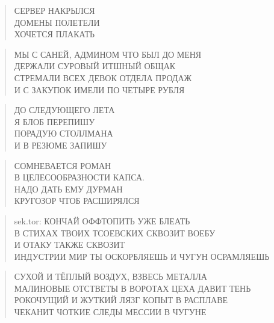 \poemtitle{***}
\begin{verse}
СЕРВЕР НАКРЫЛСЯ\\
ДОМЕНЫ ПОЛЕТЕЛИ\\
ХОЧЕТСЯ ПЛАКАТЬ
\end{verse}

\poemtitle{***}
\begin{verse}
МЫ С САНЕЙ, АДМИНОМ ЧТО БЫЛ ДО МЕНЯ\\
ДЕРЖАЛИ СУРОВЫЙ ИТШНЫЙ ОБЩАК\\
СТРЕМАЛИ ВСЕХ ДЕВОК ОТДЕЛА ПРОДАЖ\\
И С ЗАКУПОК ИМЕЛИ ПО ЧЕТЫРЕ РУБЛЯ
\end{verse}

\poemtitle{***}
\begin{verse}
ДО СЛЕДУЮЩЕГО ЛЕТА\\
Я БЛОБ ПЕРЕПИШУ\\
ПОРАДУЮ СТОЛЛМАНА\\
И В РЕЗЮМЕ ЗАПИШУ
\end{verse}

\poemtitle{***}
\begin{verse}
СОМНЕВАЕТСЯ РОМАН\\
В ЦЕЛЕСООБРАЗНОСТИ КАПСА.\\
НАДО ДАТЬ ЕМУ ДУРМАН\\
КРУГОЗОР ЧТОБ РАСШИРЯЛСЯ
\end{verse}

\poemtitle{***}
\begin{verse}
sek.tor: КОНЧАЙ ОФФТОПИТЬ УЖЕ БЛЕАТЬ\\
В СТИХАХ ТВОИХ ТСОЕВСКИХ СКВОЗИТ ВОЕБУ\\
И ОТАКУ ТАКЖЕ СКВОЗИТ\\
ИНДУСТРИИ МИР ТЫ ОСКОРБЛЯЕШЬ И ЧУГУН ОСРАМЛЯЕШЬ
\end{verse}

\poemtitle{***}
\begin{verse}
СУХОЙ И ТЁПЛЫЙ ВОЗДУХ, ВЗВЕСЬ МЕТАЛЛА\\
МАЛИНОВЫЕ ОТСТВЕТЫ В ВОРОТАХ ЦЕХА ДАВИТ ТЕНЬ\\
РОКОЧУЩИЙ И ЖУТКИЙ ЛЯЗГ КОПЫТ В РАСПЛАВЕ\\
ЧЕКАНИТ ЧОТКИЕ СЛЕДЫ МЕССИИ В ЧУГУНЕ
\end{verse}

